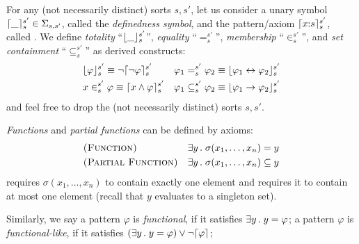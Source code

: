 \documentclass{almostllncs}
\begin{document}
\begin{definition} \label{def:definedness_symbols}

For any (not necessarily distinct) sorts $s,s'$, let us consider a unary symbol
$\lceil\_\rceil_s^{s'} \in \Sigma_{s,s'}$, called the \emph{definedness symbol},
and the pattern/axiom $\lceil x\mathord{:} s\rceil_s^{s'}$, called .
We define \emph{totality} ``$\lfloor\_\rfloor_s^{s'}$'', \emph{equality} ``$=_s^{s'}$'', 
\emph{membership} ``$\in_s^{s'}$'', and \emph{set containment} ``$\subseteq_s^{s'}$''
as derived constructs:
\begin{align*}
&\lfloor\varphi\rfloor_s^{s'} \equiv \neg \lceil\neg \varphi\rceil_s^{s'}
&\varphi_1 =_{s}^{s'} \varphi_2 \equiv \lfloor\varphi_1 \leftrightarrow \varphi_2\rfloor_s^{s'}
\\
&x \in_s^{s'} \varphi \equiv \lceil x \wedge \varphi\rceil_s^{s'}
& \varphi_1 \subseteq _{s}^{s'} \varphi_2 \equiv \lfloor\varphi_1 \to \varphi_2\rfloor_s^{s'}
\end{align*}
and feel free to drop the (not necessarily distinct) sorts $s,s'$.

\end{definition}

\emph{Functions} and \emph{partial functions} can be defined by axioms:
\vspace*{-0.5em}
\begin{align*}
&\textnormal{\textsc{(Function)}} &\exists y \,\mathord{.}\;\sigma(x_1,\dots,x_n) =  y
\\
&\textnormal{\textsc{(Partial Function)}}
&\exists y \,\mathord{.}\;\sigma(x_1,\dots,x_n) \subseteq  y
\end{align*}
\noindent
{} requires $\sigma(x_1,\dots,x_n)$ 
to contain exactly one element
and  requires it to contain at most one element
(recall that $y$ evaluates to a singleton set).

Similarly, we say a pattern $\varphi$ is \emph{functional},
if it satisfies $\exists y \,\mathord{.}\; y = \varphi $;
a pattern $\varphi$ is \emph{functional-like},
if it satisfies $(\exists y \,\mathord{.}\; y = \varphi) \vee \neg \lceil\varphi\rceil$;
\end{document}
